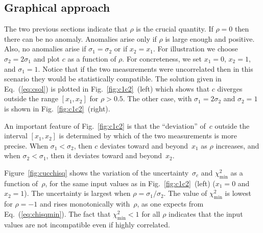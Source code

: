 \documentclass[11pt]{article}
\newcommand{\chisqmin} {\chi^2_{\mathrm{min}}}
\newcommand{\xa}   {x_1}
\newcommand{\xb}   {x_2}
\newcommand{\ua} {\sigma_{1}}
\newcommand{\ub} {\sigma_{2}}
\newcommand{\uc} {\sigma_{c}}
\begin{document}
\subsection{Graphical approach}
\par
The two previous sections indicate that $\rho$ is the crucial quantity.
If $\rho = 0$ then there can be no anomaly.  Anomalies arise only
if $\rho$ is large enough and positive.   Also, no anomalies arise if $\ua = \ub$ or if $x_2 = x_1$.
For illustration we choose $\ub = 2\ua$ and plot $c$ as a function of $\rho$.
For concreteness, we set $\xa = 0$, $\xb = 1$, and $\ua = 1$.
Notice that if the two measurements were uncorrelated then
in this scenario they would be statistically compatible.
The solution given in Eq.~(\ref{eq:csol}) is plotted in Fig.~\ref{fig:c1c2}~(left)
which shows that $c$ diverges outside the range $[ \xa, \xb]$ for $\rho > 0.5$.
The other case, with $\ua = 2\ub$ and $\ub = 1$ is shown in Fig.~\ref{fig:c1c2}~(right).
\par
An important feature of Fig.~\ref{fig:c1c2} is that the ``deviation'' of~$c$
outside the interval $[ \xa, \xb ]$ is determined by which of the two measurements
is more precise.  When $\ua < \ub$, then $c$ deviates toward and beyond~$\xa$ as $\rho$ increases,
and when $\ub < \ua$, then it deviates toward and beyond~$\xb$.
\par
Figure~\ref{fig:cucchisq} shows the variation of the uncertainty~$\uc$
and $\chisqmin$ as a function of~$\rho$, for the same input values as
in Fig.~\ref{fig:c1c2}~(left) ($\xa = 0$ and $\xb = 1$).
The uncertainty is largest when $\rho = \ua/\ub$.
The value of $\chisqmin$ is lowest for $\rho = -1$ and rises monotonically 
with~$\rho$, as one expects from Eq.~(\ref{eq:chisqmin}).  
The fact that $\chisqmin < 1$ for all $\rho$ indicates that the
input values are not incompatible even if highly correlated.
\end{document}
